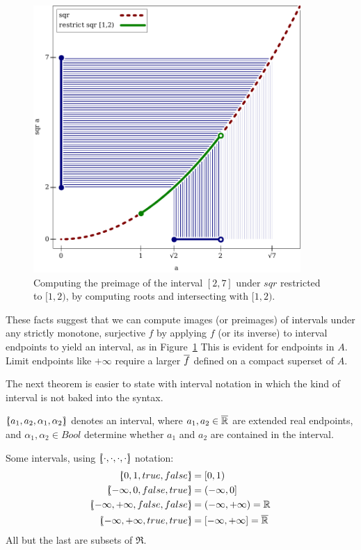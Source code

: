 \begin{figure}[!tb]
\centering
\includegraphics[width=4in]{figures/preimage-by-inverse-image}
\caption[ ]{Computing the preimage of the interval $[2,7]$ under $sqr$ restricted to $[1,2)$, by computing roots and intersecting with $[1,2)$.}
\label{fig:sqr-preimage}
\end{figure}

These facts suggest that we can compute images (or preimages) of intervals under any strictly monotone, surjective $f$ by applying $f$ (or its inverse) to interval endpoints to yield an interval, as in Figure~\ref{fig:sqr-preimage}
This is evident for endpoints in $A$.
Limit endpoints like $+\infty$ require a larger $\cl{f}$ defined on a compact superset of $A$.

The next theorem is easier to state with interval notation in which the kind of interval is not baked into the syntax.

\begin{definition}[interval]
$[\mspace{-4.5mu}(a_1,a_2,\alpha_1,\alpha_2)\mspace{-4.5mu}]$ denotes an interval, where $a_1,a_2 \in \cl{\Re}$ are extended real endpoints, and $\alpha_1,\alpha_2 \in Bool$ determine whether $a_1$ and $a_2$ are contained in the interval.
\end{definition}

\begin{example}
Some intervals, using $[\mspace{-4.5mu}(\cdot,\cdot,\cdot,\cdot)\mspace{-4.5mu}]$ notation:
\begin{equation}
\begin{aligned}
	\ivl{0,1,true,false} &= [0,1) \\
	\ivl{-\infty,0,false,true} &= (-\infty,0] \\
	\ivl{-\infty,+\infty,false,false} &= (-\infty,+\infty) = \Re \\
	\ivl{-\infty,+\infty,true,true} &= [-\infty,+\infty] = \cl{\Re}
\end{aligned}
\end{equation}
All but the last are subsets of $\Re$.
\exampleqed
\end{example}

